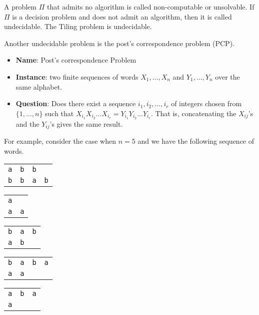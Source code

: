 \documentclass[a4paper, openany]{memoir}
\begin{document}
A problem $\Pi$ that admits no algorithm is called non-computable or unsolvable. If $\Pi$ is a decision problem and does not admit an algorithm, then it is called undecidable. The Tiling problem is undecidable.

Another undecidable problem is the post's correspondence problem (PCP).
\begin{itemize}
    \item \textbf{Name}: Post's correspondence Problem
    \item \textbf{Instance}: two finite sequences of words $X_1, \dots, X_n$ and $Y_1, \dots, Y_n$ over the same alphabet.
    \item \textbf{Question}: Does there exist a sequence $i_1, i_2, \dots, i_r$ of integers chosen from $\{1, \dots, n\}$ such that $X_{i_1} X_{i_2} \dots X_{i_r} = Y_{i_1} Y_{i_2} \dots Y_{i_r}$. That is, concatenating the $X_{ij}$'s and the $Y_{ij}$'s gives the same result.
\end{itemize}
For example, consider the case when $n = 5$ and we have the following sequence of words.
\begin{table}[H]
    \centering
    \begin{tabular}{cccc}
        \texttt{a} & \texttt{b} & \texttt{b} & \\
        \texttt{b} & \texttt{b} & \texttt{a} & \texttt{b}
    \end{tabular}
    \hspace{5pt}
    \begin{tabular}{cc}
        \texttt{a} & \\
        \texttt{a} & \texttt{a} 
    \end{tabular}
    \hspace{5pt}
    \begin{tabular}{ccc}
        \texttt{b} & \texttt{a} & \texttt{b} \\
        \texttt{a} & \texttt{b} 
    \end{tabular}
    \hspace{5pt}
    \begin{tabular}{cccc}
        \texttt{b} & \texttt{a} & \texttt{b} & \texttt{a} \\
        \texttt{a} & \texttt{a} 
    \end{tabular}
    \hspace{5pt}
    \begin{tabular}{ccc}
        \texttt{a} & \texttt{b} & \texttt{a} \\
        \texttt{a}
    \end{tabular}
\end{table}
\end{document}
